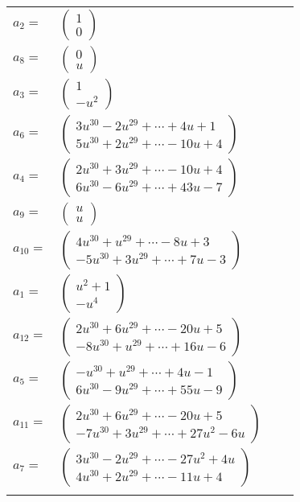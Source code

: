 \documentclass[1p]{elsarticle_modified}
\theoremstyle{definition}
\begin{document}
\begin{tabular}{m{7pt} m{180pt} m{7pt} m{180pt} }
\flushright $a_{2}=$&$\begin{pmatrix}1\\0\end{pmatrix}$ \\
\flushright $a_{8}=$&$\begin{pmatrix}0\\u\end{pmatrix}$ \\
\flushright $a_{3}=$&$\begin{pmatrix}1\\- u^2\end{pmatrix}$ \\
\flushright $a_{6}=$&$\begin{pmatrix}3 u^{30}-2 u^{29}+\cdots+4 u+1\\5 u^{30}+2 u^{29}+\cdots-10 u+4\end{pmatrix}$ \\
\flushright $a_{4}=$&$\begin{pmatrix}2 u^{30}+3 u^{29}+\cdots-10 u+4\\6 u^{30}-6 u^{29}+\cdots+43 u-7\end{pmatrix}$ \\
\flushright $a_{9}=$&$\begin{pmatrix}u\\u\end{pmatrix}$ \\
\flushright $a_{10}=$&$\begin{pmatrix}4 u^{30}+u^{29}+\cdots-8 u+3\\-5 u^{30}+3 u^{29}+\cdots+7 u-3\end{pmatrix}$ \\
\flushright $a_{1}=$&$\begin{pmatrix}u^2+1\\- u^4\end{pmatrix}$ \\
\flushright $a_{12}=$&$\begin{pmatrix}2 u^{30}+6 u^{29}+\cdots-20 u+5\\-8 u^{30}+u^{29}+\cdots+16 u-6\end{pmatrix}$ \\
\flushright $a_{5}=$&$\begin{pmatrix}- u^{30}+u^{29}+\cdots+4 u-1\\6 u^{30}-9 u^{29}+\cdots+55 u-9\end{pmatrix}$ \\
\flushright $a_{11}=$&$\begin{pmatrix}2 u^{30}+6 u^{29}+\cdots-20 u+5\\-7 u^{30}+3 u^{29}+\cdots+27 u^2-6 u\end{pmatrix}$ \\
\flushright $a_{7}=$&$\begin{pmatrix}3 u^{30}-2 u^{29}+\cdots-27 u^2+4 u\\4 u^{30}+2 u^{29}+\cdots-11 u+4\end{pmatrix}$\\&\end{tabular}
\end{document}
